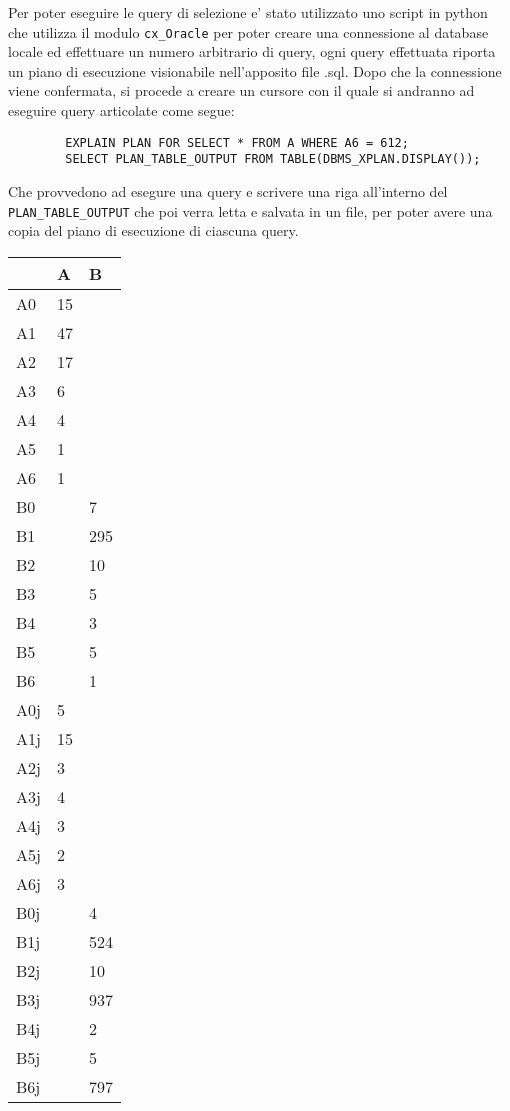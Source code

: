 Per poter eseguire le query di selezione e' stato utilizzato uno script in python che utilizza il modulo \verb|cx_Oracle| per poter creare una connessione 
al database locale ed effettuare un numero arbitrario di query, ogni query effettuata riporta un piano di esecuzione visionabile nell'apposito file 
.sql. Dopo che la connessione viene confermata, si procede a creare 
un cursore con il quale si andranno ad eseguire query articolate come segue:

\begin{verbatim}
        EXPLAIN PLAN FOR SELECT * FROM A WHERE A6 = 612;
        SELECT PLAN_TABLE_OUTPUT FROM TABLE(DBMS_XPLAN.DISPLAY());
\end{verbatim}

Che provvedono ad esegure una query e scrivere una riga all'interno del \verb|PLAN_TABLE_OUTPUT| che poi verra letta e salvata 
in un file, per poter avere una copia del piano di esecuzione di ciascuna query.

\begin{table}[!ht]
    \centering
    \begin{tabular}{|l|l|l|}
    \hline
        ~ & A & B \\ \hline
        A0 & 15 & ~ \\ \hline
        A1 & 47 & ~ \\ \hline
        A2 & 17 & ~ \\ \hline
        A3 & 6 & ~ \\ \hline
        A4 & 4 & ~ \\ \hline
        A5 & 1 & ~ \\ \hline
        A6 & 1 & ~ \\ \hline
        B0 & ~ & 7 \\ \hline
        B1 & ~ & 295 \\ \hline
        B2 & ~ & 10 \\ \hline
        B3 & ~ & 5 \\ \hline
        B4 & ~ & 3 \\ \hline
        B5 & ~ & 5 \\ \hline
        B6 & ~ & 1 \\ \hline
        A0j & 5 & ~ \\ \hline
        A1j & 15 & ~ \\ \hline
        A2j & 3 & ~ \\ \hline
        A3j & 4 & ~ \\ \hline
        A4j & 3 & ~ \\ \hline
        A5j & 2 & ~ \\ \hline
        A6j & 3 & ~ \\ \hline
        B0j & ~ & 4 \\ \hline
        B1j & ~ & 524 \\ \hline
        B2j & ~ & 10 \\ \hline
        B3j & ~ & 937 \\ \hline
        B4j & ~ & 2 \\ \hline
        B5j & ~ & 5 \\ \hline
        B6j & ~ & 797 \\ \hline
    \end{tabular}
\end{table}